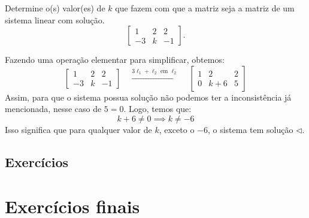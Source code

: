 \begin{exeresol}
Determine o(s) valor(es) de $k$ que fazem com que a matriz seja a matriz de um sistema linear com solução.
\begin{equation}
 \left[
  \begin{array}{cc|c}
    1 & 2 & 2 \\
    -3 & k & -1
  \end{array}
\right].
\end{equation}
\end{exeresol}
\begin{resol}
Fazendo uma operação elementar para simplificar, obtemos:
\begin{equation}
  \left[
  \begin{array}{cc|c}
    1 & 2 & 2 \\
    -3 & k & -1
  \end{array}
\right]
\quad \xrightarrow{3\ell_1 + \ell_2 \text{ em } \ell_2} \quad
 \left[
  \begin{array}{cc|c}
    1 & 2 & 2 \\
    0 & k + 6 & 5
  \end{array}
\right]
\end{equation}
Assim, para que o sistema possua solução não podemos ter a inconsistência já mencionada, nesse caso de $5 = 0$. Logo, temos que:
\begin{equation}
 k + 6 \neq 0 \implies k \neq -6
\end{equation}
Isso significa que para qualquer valor de $k$, exceto o $-6$, o sistema tem solução $\lhd$.
\end{resol}

\subsection*{Exercícios}

\construirExer

\section{Exercícios finais}

\construirExer


%
